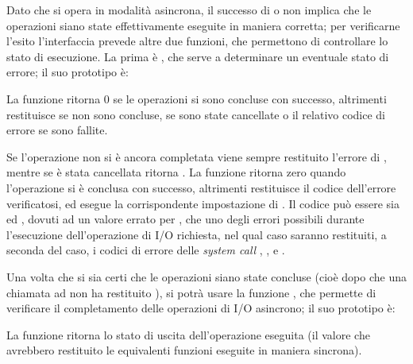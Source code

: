 Dato che si opera in modalità asincrona, il successo di  o
 non implica che le operazioni siano state effettivamente
eseguite in maniera corretta; per verificarne l'esito l'interfaccia prevede
altre due funzioni, che permettono di controllare lo stato di esecuzione. La
prima è , che serve a determinare un eventuale stato di
errore; il suo prototipo è:

\begin{funcproto}{
}

{La funzione ritorna $0$ se le operazioni si sono concluse con successo,
  altrimenti restituisce  se non sono concluse,
   se sono state cancellate o il relativo codice di errore
  se sono fallite.}
\end{funcproto}

Se l'operazione non si è ancora completata viene sempre restituito l'errore di
, mentre se è stata cancellata ritorna
. La funzione ritorna zero quando l'operazione si è
conclusa con successo, altrimenti restituisce il codice dell'errore
verificatosi, ed esegue la corrispondente impostazione di . Il
codice può essere sia  ed , dovuti ad un valore
errato per , che uno degli errori possibili durante l'esecuzione
dell'operazione di I/O richiesta, nel qual caso saranno restituiti, a seconda
del caso, i codici di errore delle \textit{system call} ,
,  e .

Una volta che si sia certi che le operazioni siano state concluse (cioè dopo
che una chiamata ad  non ha restituito
), si potrà usare la funzione , che
permette di verificare il completamento delle operazioni di I/O asincrono; il
suo prototipo è:

\begin{funcproto}{
}

{La funzione ritorna lo stato di uscita dell'operazione eseguita (il valore
  che avrebbero restituito le equivalenti funzioni eseguite in maniera
  sincrona).}
\end{funcproto}

